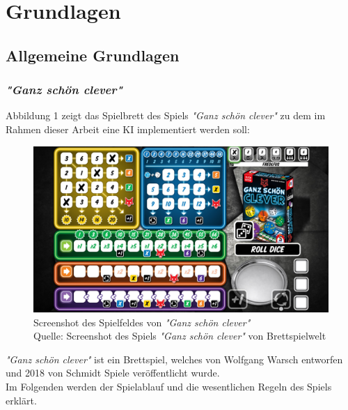 \section{Grundlagen}
\subsection{Allgemeine Grundlagen}
\subsubsection{\textit{"Ganz schön clever"}}
	Abbildung 1 zeigt das Spielbrett des Spiels \textit{"Ganz schön clever"} zu dem im Rahmen dieser Arbeit eine KI implementiert werden soll:
	\nopagebreak
\begin{figure}[H]
	\includegraphics[width=1\textwidth]{Bilder/gsc} 
	\caption[\textit{"Ganz schön clever"}]{Screenshot des Spielfeldes von \textit{"Ganz schön clever"}\\ Quelle: Screenshot des Spiels \textit{"Ganz schön clever"} von Brettspielwelt}
\end{figure}

\textit{"Ganz schön clever"} ist ein Brettspiel, welches von Wolfgang Warsch entworfen und 2018 von Schmidt Spiele veröffentlicht wurde.\\

Im Folgenden werden der Spielablauf und die wesentlichen Regeln des Spiels erklärt.

